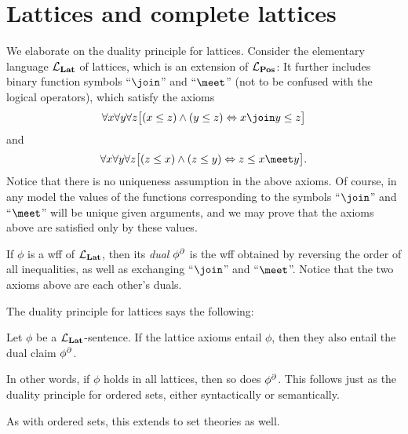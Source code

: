 \documentclass[article, a4paper, 11pt, oneside]{memoir}
\numberwithin{equation}{chapter}
\newcommand{\ncat}[1]{\mathbf{#1}} %
\theoremstyle{nonumberplain}
\newenvironment{displaytheorem}{%
	\begin{displayquote}\itshape%
}{%
	\end{displayquote}%
}
\begin{document}
\chapter{Lattices and complete lattices}

\newcommand{\catLat}{\ncat{Lat}}
\newcommand{\catCLat}{\ncat{CLat}}


\begin{remarkbreak}
    We elaborate on the duality principle for lattices. Consider the elementary language $\calL_\catLat$ of lattices, which is an extension of $\calL_\catPos$: It further includes binary function symbols \enquote{$\join$} and \enquote{$\meet$} (not to be confused with the logical operators), which satisfy the axioms
    \begin{equation*}
        \forall x \forall y \forall z \bigl[ (x \leq z) \land (y \leq z) \Leftrightarrow x \join y \leq z \bigr]
    \end{equation*}
    and
    \begin{equation*}
        \forall x \forall y \forall z \bigl[ (z \leq x) \land (z \leq y) \Leftrightarrow z \leq x \meet y \bigr].
    \end{equation*}
    Notice that there is no uniqueness assumption in the above axioms. Of course, in any model the values of the functions corresponding to the symbols \enquote{$\join$} and \enquote{$\meet$} will be unique given arguments, and we may prove that the axioms above are satisfied only by these values.

    If $\phi$ is a wff of $\calL_\catLat$, then its \emph{dual} $\phi^{\partial}$ is the wff obtained by reversing the order of all inequalities, as well as exchanging \enquote{$\join$} and \enquote{$\meet$}. Notice that the two axioms above are each other's duals.
    
    The duality principle for lattices says the following:
    \begin{displaytheorem}
        Let $\phi$ be a $\calL_\catLat$-sentence. If the lattice axioms entail $\phi$, then they also entail the dual claim $\phi^{\partial}$.
    \end{displaytheorem}
    In other words, if $\phi$ holds in all lattices, then so does $\phi^{\partial}$. This follows just as the duality principle for ordered sets, either syntactically or semantically.

    As with ordered sets, this extends to set theories as well.
\end{remarkbreak}
\end{document}
